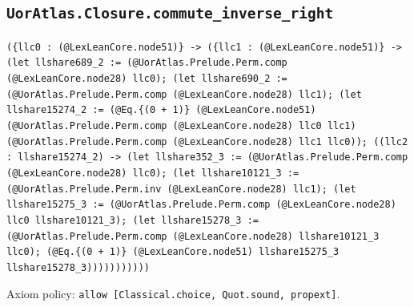 \documentclass[11pt]{article}
\begin{document}
\subsection*{\texttt{UorAtlas.Closure.commute\_inverse\_right}}
\noindent\texttt{(\{llc0 : (@LexLeanCore.node51)\} -> (\{llc1 : (@LexLeanCore.node51)\} -> (let llshare689\_2 := (@UorAtlas.Prelude.Perm.comp (@LexLeanCore.node28) llc0); (let llshare690\_2 := (@UorAtlas.Prelude.Perm.comp (@LexLeanCore.node28) llc1); (let llshare15274\_2 := (@Eq.\{(0 + 1)\} (@LexLeanCore.node51) (@UorAtlas.Prelude.Perm.comp (@LexLeanCore.node28) llc0 llc1) (@UorAtlas.Prelude.Perm.comp (@LexLeanCore.node28) llc1 llc0)); ((llc2 : llshare15274\_2) -> (let llshare352\_3 := (@UorAtlas.Prelude.Perm.comp (@LexLeanCore.node28) llc0); (let llshare10121\_3 := (@UorAtlas.Prelude.Perm.inv (@LexLeanCore.node28) llc1); (let llshare15275\_3 := (@UorAtlas.Prelude.Perm.comp (@LexLeanCore.node28) llc0 llshare10121\_3); (let llshare15278\_3 := (@UorAtlas.Prelude.Perm.comp (@LexLeanCore.node28) llshare10121\_3 llc0); (@Eq.\{(0 + 1)\} (@LexLeanCore.node51) llshare15275\_3 llshare15278\_3)))))))))))}\par
\noindent Axiom policy: \texttt{allow [Classical.choice, Quot.sound, propext]}.\par
\end{document}
